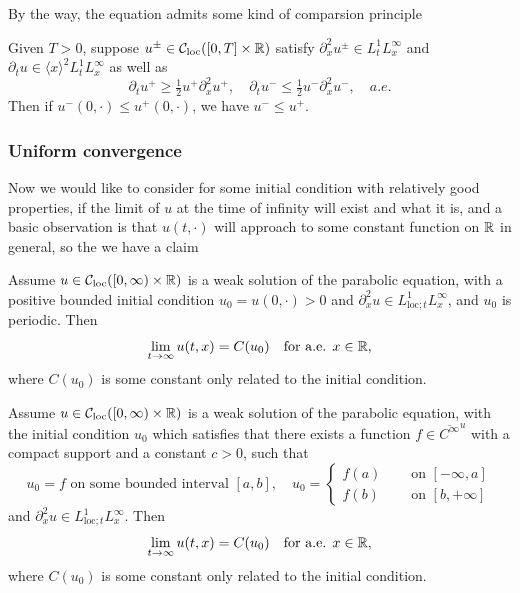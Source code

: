 By the way, the equation admits some kind of comparsion principle

\begin{proposition}
    Given $T > 0$, suppose $u^{\pm}\in \mathcal{C}_{\text{loc}}([0,T]\times \mathbb{R})$ satisfy $\partial_x^2 u^{\pm} \in L^1_tL^{\infty}_x$ and $\partial_t u \in \langle x\rangle^2L^1_tL^{\infty}_x$ as well as
    \[
    \partial_t u^+ \geq \tfrac12 u^+\partial_x^2 u^+,\quad \partial_t u^- \leq \tfrac12 u^-\partial_x^2 u^-, \quad a.e.
    \]
    Then if $u^-(0,\cdot) \leq u^+(0,\cdot)$, we have $u^- \leq u^+$.
\end{proposition}

\subsubsection{Uniform convergence}

Now we would like to consider for some initial condition with relatively good properties, if the limit of $u$ at the time of infinity will exist and what it is, and a basic observation is that $u(t,\cdot)$ will approach to some constant function on $\mathbb{R}$ in general, so the we have a claim

\begin{theorem}
    Assume $u \in \mathcal{C}_{\text{loc}}([0,\infty)\times\mathbb{R})$ is a weak solution of the parabolic equation, with a positive bounded initial condition $u_0 = u(0,\cdot) > 0$ and $\partial^2_x u \in L_{\text{loc};t}^1L_x^{\infty}$, and $u_0$ is periodic. Then \[\lim_{t\to \infty}u(t,x) = C(u_0)\quad\text{for a.e. }x\in\mathbb{R},\] where $C(u_0)$ is some constant only related to the initial condition.  
\end{theorem}
\begin{theorem}
    Assume $u \in \mathcal{C}_{\text{loc}}([0,\infty)\times\mathbb{R})$ is a weak solution of the parabolic equation, with the initial condition $u_0$ which satisfies that there exists a function $f \in \overline{C^{\infty}}^{u}$ with a compact support and a constant $c > 0$, such that
    \[
    u_0 = f\text{ on some bounded interval }[a,b],\quad u_0 =\begin{cases}
         f(a)\quad &\text{ on }[-\infty, a] \\
         f(b)&\text{ on }[b,+\infty]
    \end{cases}
    \]
    and $\partial^2_x u \in L_{\text{loc};t}^1L_x^{\infty}$. Then \[\lim_{t\to \infty}u(t,x) = C(u_0)\quad\text{for a.e. }x\in\mathbb{R},\] where $C(u_0)$ is some constant only related to the initial condition.
\end{theorem}

